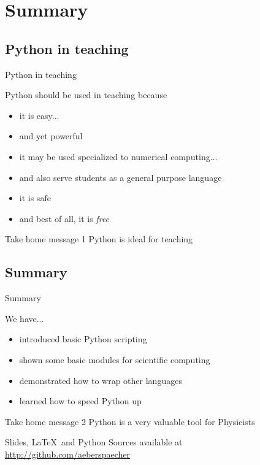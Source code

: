\section{Summary}

\subsection{Python in teaching}

\begin{frame}{Python in teaching}

Python should be used in teaching because

\begin{itemize}
	\item it is easy...
	\item and yet powerful
	\item it may be used specialized to numerical computing...
	\item and also serve students as a general purpose language
	\item it is safe
	\item and best of all, it is \emph{free}
\end{itemize}

\begin{alertbbox}{Take home message 1}
Python is ideal for teaching
\end{alertbbox}

\end{frame}

\subsection{Summary}

\begin{frame}{Summary}

We have...

\begin{itemize}
	\item introduced basic Python scripting
	\item shown some basic modules for scientific computing
	\item demonstrated how to wrap other languages
	\item learned how to speed Python up
\end{itemize}

\begin{alertbbox}{Take home message 2}
Python is a very valuable tool for Physicists
\end{alertbbox}

Slides, \LaTeX~and Python Sources available at\\
\url{http://github.com/aeberspaecher}

\end{frame}
